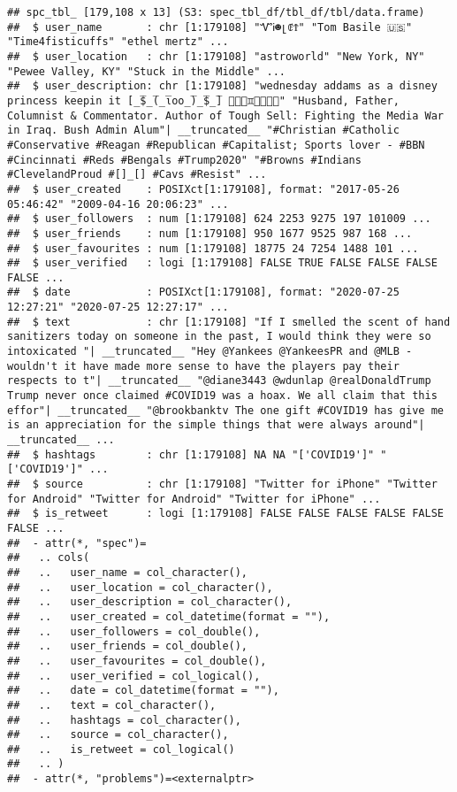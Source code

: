 \documentclass[
]{article}
\begin{document}
\begin{verbatim}
## spc_tbl_ [179,108 x 13] (S3: spec_tbl_df/tbl_df/tbl/data.frame)
##  $ user_name       : chr [1:179108] "ᏉᎥ☻լꂅϮ" "Tom Basile 🇺🇸" "Time4fisticuffs" "ethel mertz" ...
##  $ user_location   : chr [1:179108] "astroworld" "New York, NY" "Pewee Valley, KY" "Stuck in the Middle" ...
##  $ user_description: chr [1:179108] "wednesday addams as a disney princess keepin it [̲̅$̲̅(̲̅ιοο̲̅)̲̅$̲̅] 👸🏻💚♊️🧀🌵🌃🌙" "Husband, Father, Columnist & Commentator. Author of Tough Sell: Fighting the Media War in Iraq. Bush Admin Alum"| __truncated__ "#Christian #Catholic #Conservative #Reagan #Republican #Capitalist; Sports lover - #BBN #Cincinnati #Reds #Bengals #Trump2020" "#Browns #Indians #ClevelandProud #[]_[] #Cavs #Resist" ...
##  $ user_created    : POSIXct[1:179108], format: "2017-05-26 05:46:42" "2009-04-16 20:06:23" ...
##  $ user_followers  : num [1:179108] 624 2253 9275 197 101009 ...
##  $ user_friends    : num [1:179108] 950 1677 9525 987 168 ...
##  $ user_favourites : num [1:179108] 18775 24 7254 1488 101 ...
##  $ user_verified   : logi [1:179108] FALSE TRUE FALSE FALSE FALSE FALSE ...
##  $ date            : POSIXct[1:179108], format: "2020-07-25 12:27:21" "2020-07-25 12:27:17" ...
##  $ text            : chr [1:179108] "If I smelled the scent of hand sanitizers today on someone in the past, I would think they were so intoxicated "| __truncated__ "Hey @Yankees @YankeesPR and @MLB - wouldn't it have made more sense to have the players pay their respects to t"| __truncated__ "@diane3443 @wdunlap @realDonaldTrump Trump never once claimed #COVID19 was a hoax. We all claim that this effor"| __truncated__ "@brookbanktv The one gift #COVID19 has give me is an appreciation for the simple things that were always around"| __truncated__ ...
##  $ hashtags        : chr [1:179108] NA NA "['COVID19']" "['COVID19']" ...
##  $ source          : chr [1:179108] "Twitter for iPhone" "Twitter for Android" "Twitter for Android" "Twitter for iPhone" ...
##  $ is_retweet      : logi [1:179108] FALSE FALSE FALSE FALSE FALSE FALSE ...
##  - attr(*, "spec")=
##   .. cols(
##   ..   user_name = col_character(),
##   ..   user_location = col_character(),
##   ..   user_description = col_character(),
##   ..   user_created = col_datetime(format = ""),
##   ..   user_followers = col_double(),
##   ..   user_friends = col_double(),
##   ..   user_favourites = col_double(),
##   ..   user_verified = col_logical(),
##   ..   date = col_datetime(format = ""),
##   ..   text = col_character(),
##   ..   hashtags = col_character(),
##   ..   source = col_character(),
##   ..   is_retweet = col_logical()
##   .. )
##  - attr(*, "problems")=<externalptr>
\end{verbatim}
\end{document}

